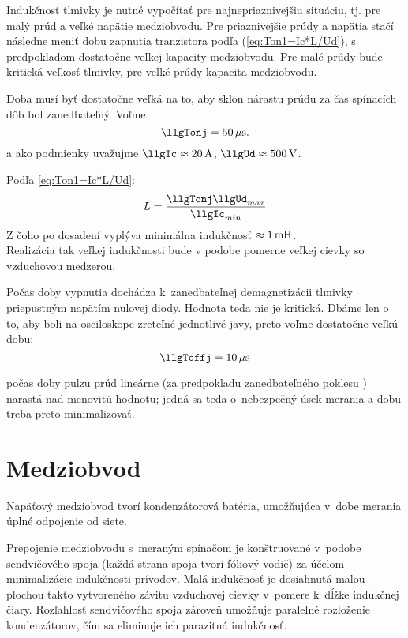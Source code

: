 Indukčnosť tlmivky je nutné vypočítať pre najnepriaznivejšiu situáciu, tj. pre malý prúd a veľké napätie medziobvodu. Pre priaznivejšie prúdy a napätia stačí následne meniť dobu zapnutia tranzistora podľa (\ref{eq:Ton1=Ic*L/Ud}), s predpokladom dostatočne veľkej kapacity medziobvodu. Pre malé prúdy bude kritická veľkosť tlmivky, pre veľké prúdy kapacita medziobvodu.

Doba \llgTonj musí byť dostatočne veľká na to, aby sklon nárastu prúdu za čas spínacích dôb bol zanedbateľný. 
Voľme 
\begin{equation}
	\llgTonj = 50 \un{\mu s}.
	\label{eq:Tonj_volba_50us}
\end{equation}
a ako  podmienky uvažujme $\llgIc \approx 20 \un{A}$, $\llgUd \approx 500 \un{V}$.

Podľa {\ref{eq:Ton1=Ic*L/Ud}}:
\begin{equation}
	L = \frac{\llgTonj \llgUd_{max}}{\llgIc_{min}}
	\label{eq:L=Ton1*Ud/Ic}
\end{equation}
Z čoho po dosadení vyplýva minimálna indukčnosť $\approx 1\, \mathrm{mH}$.\\
Realizácia tak veľkej indukčnosti bude v podobe pomerne veľkej cievky so vzduchovou medzerou.


Počas doby vypnutia \llgToffj dochádza k~zanedbateľnej demagnetizácii tlmivky priepustným napätím nulovej diody. Hodnota \llgToffj teda nie je kritická. Dbáme len o to, aby boli na osciloskope zreteľné jednotlivé javy, preto voľme dostatočne veľkú dobu:
\begin{equation}
	\llgToffj = 10 \un{\mu s}
	\label{eq:Toff1_volba_10us}
\end{equation}

počas doby pulzu \llgTond prúd \llgic lineárne (za predpokladu zanedbateľného poklesu \llgUd) narastá nad menovitú hodnotu; jedná sa teda o~nebezpečný úsek merania a dobu \llgTond treba preto minimalizovať.

\section{Medziobvod} \label{sc:medziobvod}
Napäťový medziobvod tvorí kondenzátorová batéria, umožňujúca v~dobe merania úplné odpojenie od siete.

Prepojenie medziobvodu s~meraným spínačom je konštruované v~podobe sendvičového spoja (každá strana spoja tvorí fóliový vodič) za účelom minimalizácie indukčnosti prívodov. Malá indukčnosť je dosiahnutá malou plochou takto vytvoreného závitu vzduchovej cievky v~pomere k~dĺžke indukčnej čiary. Rozľahlosť sendvičového spoja zároveň umožňuje paralelné rozloženie kondenzátorov, čím sa eliminuje ich parazitná indukčnosť.

